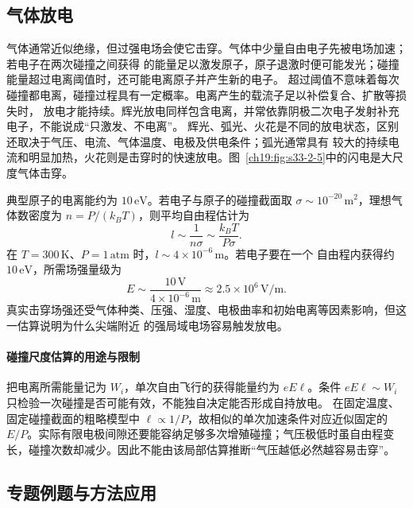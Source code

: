\subsection{气体放电}


气体通常近似绝缘，但过强电场会使它击穿。气体中少量自由电子先被电场加速；若电子在两次碰撞之间获得
的能量足以激发原子，原子退激时便可能发光；碰撞能量超过电离阈值时，还可能电离原子并产生新的电子。
超过阈值不意味着每次碰撞都电离，碰撞过程具有一定概率。电离产生的载流子足以补偿复合、扩散等损失时，
放电才能持续。辉光放电同样包含电离，并常依靠阴极二次电子发射补充电子，不能说成“只激发、不电离”。
辉光、弧光、火花是不同的放电状态，区别还取决于气压、电流、气体温度、电极及供电条件；弧光通常具有
较大的持续电流和明显加热，火花则是击穿时的快速放电。图~\ref{ch19:fig:s33-2-5}中的闪电是大尺度气体击穿。

\par\noindent\begin{minipage}{\linewidth}
\lightningFigure
{}\label{ch19:fig:s33-2-5}
\end{minipage}\par\medskip

典型原子的电离能约为 $10\,\mathrm{eV}$。若电子与原子的碰撞截面取
$\sigma\sim10^{-20}\,\mathrm{m^2}$，理想气体数密度为 $n=P/(k_BT)$，则平均自由程估计为
\[
  l\sim\frac1{n\sigma}\sim\frac{k_BT}{P\sigma}.
\]
在 $T=300\,\mathrm K$、$P=1\,\mathrm{atm}$ 时，$l\sim4\times10^{-6}\,\mathrm m$。若电子要在一个
自由程内获得约 $10\,\mathrm{eV}$，所需场强量级为
\[
  E\sim\frac{10\,\mathrm V}{4\times10^{-6}\,\mathrm m}
  \approx2.5\times10^6\,\mathrm{V/m}.
\]
真实击穿场强还受气体种类、压强、湿度、电极曲率和初始电离等因素影响，但这一估算说明为什么尖端附近
的强局域电场容易触发放电。


\paragraph{碰撞尺度估算的用途与限制}
把电离所需能量记为 $W_i$，单次自由飞行的获得能量约为 $eE\ell$。条件 $eE\ell\sim W_i$ 只检验一次碰撞是否可能有效，不能独自决定能否形成自持放电。
在固定温度、固定碰撞截面的粗略模型中 $\ell\propto1/P$，故相似的单次加速条件对应近似固定的 $E/P$。实际有限电极间隙还要能容纳足够多次增殖碰撞；气压极低时虽自由程变长，碰撞次数却减少。因此不能由该局部估算推断“气压越低必然越容易击穿”。


\subsection{专题例题与方法应用}

